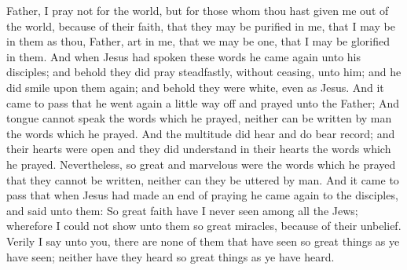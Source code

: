 Father, I pray not for the world, but for those whom thou hast given me out of the world, because of their faith, that they may be purified in me, that I may be in them as thou, Father, art in me, that we may be one, that I may be glorified in them.
\bverse \iffalse And when Jesus had spoken these words he came again unto his disciples; and behold they did pray steadfastly, without ceasing, unto him; and he did smile upon them again; and behold they were white, even as Jesus. \fi
And when Jesus had spoken these words he came again unto his disciples; and behold they did pray steadfastly, without ceasing, unto him; and he did smile upon them again; and behold they were white, even as Jesus.
\bverse \iffalse And it came to pass that he went again a little way off and prayed unto the Father; \fi
And it came to pass that he went again a little way off and prayed unto the Father;
\bverse \iffalse And tongue cannot speak the words which he prayed, neither can be written by man the words which he prayed. \fi
And tongue cannot speak the words which he prayed, neither can be written by man the words which he prayed.
\bverse \iffalse And the multitude did hear and do bear record; and their hearts were open and they did understand in their hearts the words which he prayed. \fi
And the multitude did hear and do bear record; and their hearts were open and they did understand in their hearts the words which he prayed.
\bverse \iffalse Nevertheless, so great and marvelous were the words which he prayed that they cannot be written, neither can they be uttered by man. \fi
Nevertheless, so great and marvelous were the words which he prayed that they cannot be written, neither can they be uttered by man.
\bverse \iffalse And it came to pass that when Jesus had made an end of praying he came again to the disciples, and said unto them: So great faith have I never seen among all the Jews; wherefore I could not show unto them so great miracles, because of their unbelief. \fi
And it came to pass that when Jesus had made an end of praying he came again to the disciples, and said unto them: So great faith have I never seen among all the Jews; wherefore I could not show unto them so great miracles, because of their unbelief.
\bverse \iffalse Verily I say unto you, there are none of them that have seen so great things as ye have seen; neither have they heard so great things as ye have heard. \fi
Verily I say unto you, there are none of them that have seen so great things as ye have seen; neither have they heard so great things as ye have heard.
